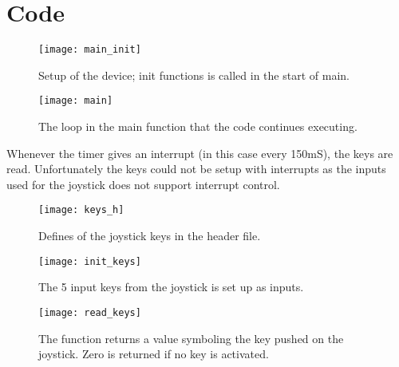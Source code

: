 \section{Code}
\begin{figure}[h!]		%
	\begin{centering}
 		\texttt{[image: main\_init]}
		\caption{Setup of the device; init functions is called in the start of main.}
	\end{centering}
\end{figure}

\newpage

\begin{figure}[h!]		%
	\begin{centering}
 		\texttt{[image: main]}
		\caption{The loop in the main function that the code continues executing.}
	\end{centering}
\end{figure}

Whenever the timer gives an interrupt (in this case every 150mS), the keys are read. Unfortunately the keys could not be setup with interrupts as the inputs used for the joystick does not support interrupt control.

\begin{figure}[h!]		%
	\begin{centering}
 		\texttt{[image: keys\_h]}
		\caption{Defines of the joystick keys in the header file.}
	\end{centering}
\end{figure}

\begin{figure}[h!]		%
	\begin{centering}
 		\texttt{[image: init\_keys]}
		\caption{The 5 input keys from the joystick is set up as inputs.}
	\end{centering}
\end{figure}

\begin{figure}[h!]		%
	\begin{centering}
 		\texttt{[image: read\_keys]}
		\caption{The function returns a value symboling the key pushed on the joystick. Zero is returned if no key is activated.}
	\end{centering}
\end{figure}

